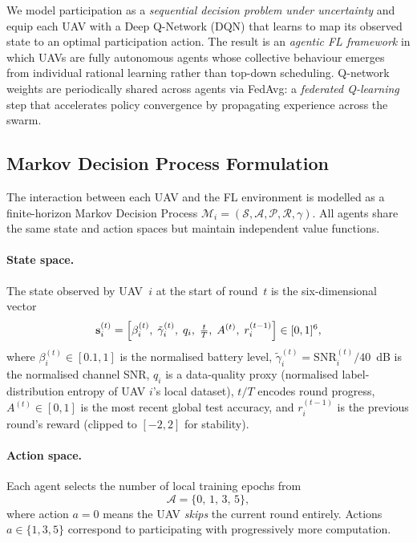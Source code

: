 \documentclass[12pt,a4paper]{article}
\begin{document}
We model participation as a \emph{sequential decision problem under uncertainty}
and equip each UAV with a Deep Q-Network (DQN) \cite{mnih2015} that learns to map
its observed state to an optimal participation action.  The result is an
\emph{agentic FL framework} in which UAVs are fully autonomous agents whose
collective behaviour emerges from individual rational learning rather than
top-down scheduling.  Q-network weights are periodically shared across agents
via FedAvg: a \emph{federated Q-learning} step that accelerates policy
convergence by propagating experience across the swarm.

\subsection{Markov Decision Process Formulation}

The interaction between each UAV and the FL environment is modelled as a
finite-horizon Markov Decision Process $\mathcal{M}_i = (\mathcal{S}, \mathcal{A},
\mathcal{P}, \mathcal{R}, \gamma)$.  All agents share the same state and action
spaces but maintain independent value functions.

\paragraph{State space.}
The state observed by UAV~$i$ at the start of round~$t$ is the six-dimensional
vector
\begin{equation}
  \mathbf{s}_i^{(t)} = \Bigl[
    \beta_i^{(t)},\;
    \tilde{\gamma}_i^{(t)},\;
    q_i,\;
    \tfrac{t}{T},\;
    A^{(t)},\;
    r_i^{(t-1)}
  \Bigr] \in [0,1]^6,
  \label{eq:state}
\end{equation}
where $\beta_i^{(t)} \in [0.1, 1]$ is the normalised battery level,
$\tilde{\gamma}_i^{(t)} = \mathrm{SNR}_{i}^{(t)} / 40$~dB is the normalised
channel SNR, $q_i$ is a data-quality proxy (normalised label-distribution entropy
of UAV $i$'s local dataset), $t/T$ encodes round progress, $A^{(t)} \in [0,1]$
is the most recent global test accuracy, and $r_i^{(t-1)}$ is the previous round's
reward (clipped to $[-2, 2]$ for stability).

\paragraph{Action space.}
Each agent selects the number of local training epochs from
\begin{equation}
  \mathcal{A} = \{0,\, 1,\, 3,\, 5\},
  \label{eq:actions}
\end{equation}
where action $a = 0$ means the UAV \emph{skips} the current round entirely.
Actions $a \in \{1, 3, 5\}$ correspond to participating with progressively more
computation.
\end{document}
